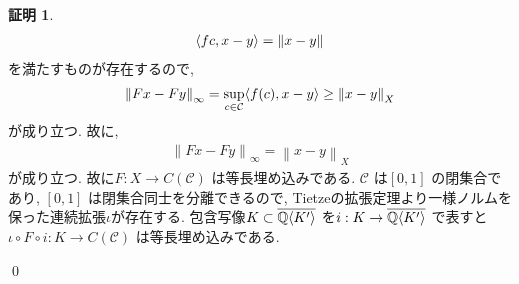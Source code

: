 \documentclass[10pt, fleqn, label-section=none]{bxjsarticle}
\theoremstyle{definition}
\newtheorem*{pf*}{証明}
\newcommand{\tbra}[1]{\mleft\langle#1\mright\rangle}
\newcommand{\norm}[1]{\left\|#1\right\|}
\renewcommand{\;}{\, ; \,}
\begin{document}
\begin{pf*}
 \begin{align*} \tbra{fc, x-y} = \norm{x - y}\end{align*}
 を満たすものが存在するので, 
 \begin{align*} \norm{Fx - Fy}_{\infty} = \sup_{c \in \mathcal C} \tbra{f (c) , x - y  }  \geq \norm{x - y}_X \end{align*}
 が成り立つ. 故に, 
 \begin{align*} \norm{Fx - Fy}_{\infty} = \norm{x - y}_X \end{align*}
 が成り立つ. 故に$F: X \rightarrow C(\mathcal C) $ は等長埋め込みである. $\mathcal C$ は$[0, 1]$ の閉集合であり, $[0, 1]$ は閉集合同士を分離できるので, Tietzeの拡張定理より一様ノルムを保った連続拡張$\iota$が存在する. 包含写像$K \subset \overline{\mathbb  Q \tbra{K^\prime } }$ を$i:K \rightarrow  \overline{\mathbb  Q \tbra{K^\prime } } $ で表すと$\iota \circ F \circ i : K \rightarrow C(\mathcal C)$
 は等長埋め込みである. 
 
\qed
\end{pf*}
\end{document}
